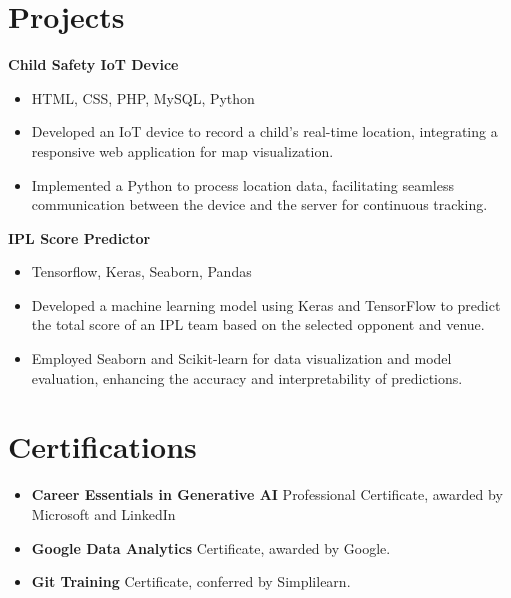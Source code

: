 \documentclass{article}
\begin{document}
\section*{Projects}
\vspace{-3mm}
\textbf{Child Safety IoT Device}
\vspace{-2mm}
\begin{itemize}[leftmargin=*,itemsep = 0.3mm]
    \item HTML, CSS, PHP, MySQL, Python
    \item Developed an IoT device to record a child’s real-time location, integrating a responsive web application for map visualization.
    \item Implemented a Python to process location data, facilitating seamless communication between the device and the server for continuous tracking.
\end{itemize}
\vspace{-1mm}
\textbf{IPL Score Predictor}
\vspace{-2mm}
\begin{itemize}[leftmargin=*,itemsep = 0.3mm]
    \item Tensorflow, Keras, Seaborn, Pandas
    \item Developed a machine learning model using Keras and TensorFlow to predict the total score of an IPL team based on the selected opponent and venue.
    \item Employed Seaborn and Scikit-learn for data visualization and model evaluation, enhancing the accuracy and interpretability of predictions.
\end{itemize}
\vspace{-7mm}
\section*{Certifications}
\vspace{-3mm}
\begin{itemize}[leftmargin=*,itemsep = 0.4mm]
    \item \textbf{Career Essentials in Generative AI} Professional Certificate, awarded by Microsoft and LinkedIn
    \item \textbf{Google Data Analytics} Certificate, awarded by Google.
    \item \textbf{Git Training} Certificate, conferred by Simplilearn.
\end{itemize}
\vspace{-8mm}
\end{document}
